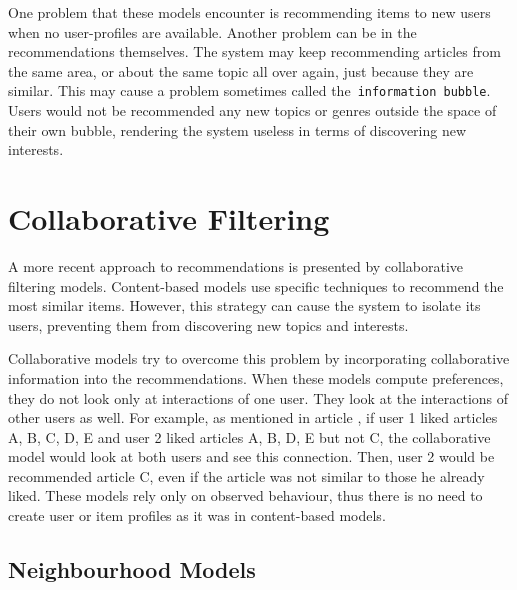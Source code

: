One problem that these models encounter is recommending items to new users when no user-profiles are available. Another problem can be in the recommendations themselves. The system may keep recommending articles from the same area, or about the same topic all over again, just because they are similar. This may cause a problem sometimes called the~\texttt{information bubble}. Users would not be recommended any new topics or genres outside the space of their own bubble, rendering the system useless in terms of discovering new interests.

\section{Collaborative Filtering} \label{cf_theory}

A more recent approach to recommendations is presented by collaborative filtering models. Content-based models use specific techniques to recommend the most similar items. However, this strategy can cause the system to isolate its users, preventing them from discovering new topics and interests. 

Collaborative models try to overcome this problem by incorporating collaborative information into the recommendations. When these models compute preferences, they do not look only at interactions of one user. They look at the interactions of other users as well. For example, as mentioned in article \cite{GoogleCloud}, if user 1 liked articles A, B, C, D, E and user 2 liked articles A, B, D, E but not C, the collaborative model would look at both users and see this connection. Then, user 2 would be recommended article C, even if the article was not similar to those he already liked. These models rely only on observed behaviour, thus there is no need to create user or item profiles as it was in content-based models.



\subsection{Neighbourhood Models}

